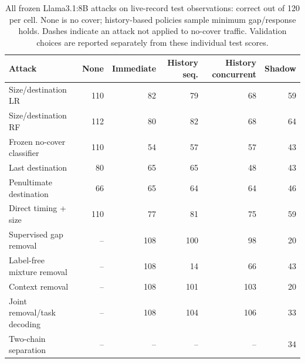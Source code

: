 \begin{table}[t]\centering\small
\caption{All frozen Llama3.1:8B attacks on live-record test observations: correct out of 120 per cell. None is no cover; history-based policies sample minimum gap/response holds. Dashes indicate an attack not applied to no-cover traffic. Validation choices are reported separately from these individual test scores.}
\label{tab:live-attacks-llama}
\setlength{\tabcolsep}{5pt}
\begin{tabularx}{\textwidth}{@{}Yrrrrr@{}}\toprule
Attack & None & Immediate & History seq. & History concurrent & Shadow\\\midrule
Size/destination LR & 110 & 82 & 79 & 68 & 59\\
Size/destination RF & 112 & 80 & 82 & 68 & 64\\
Frozen no-cover classifier & 110 & 54 & 57 & 57 & 43\\
Last destination & 80 & 65 & 65 & 48 & 43\\
Penultimate destination & 66 & 65 & 64 & 64 & 46\\
Direct timing + size & 110 & 77 & 81 & 75 & 59\\
Supervised gap removal & -- & 108 & 100 & 98 & 20\\
Label-free mixture removal & -- & 108 & 14 & 66 & 43\\
Context removal & -- & 108 & 101 & 103 & 20\\
Joint removal/task decoding & -- & 108 & 104 & 106 & 33\\
Two-chain separation & -- & -- & -- & -- & 34\\
\bottomrule\end{tabularx}
\end{table}
